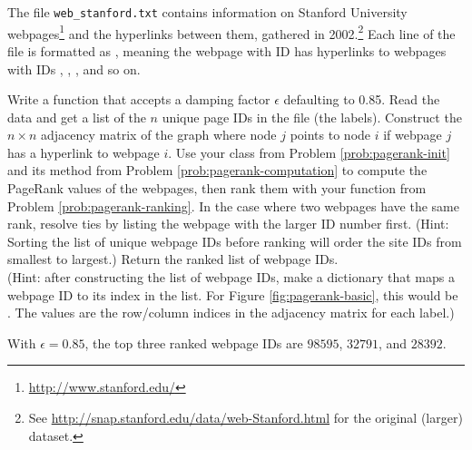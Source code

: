 \begin{comment}
Looking at Figure \ref{fig:pagerank-nosinks}, it is easy to see why a has the lowest PageRank value: the only other node that points to it is b.
It also makes sense that c has the highest ranking, since c and d both have edges from the other three nodes pointing to them, but d only has one edge (pointing to c), while c points to both b and d.
In other words, at each step d distributes all of its importance to c, while c splits its importance between b and d.

Of course, constructing rankings is much more difficult to do by hand when there are more than just a few nodes in the graph.
\end{comment}

\begin{problem} %
The file \texttt{web\_stanford.txt} contains information on Stanford University webpages\footnote{\url{http://www.stanford.edu/}} and the hyperlinks between them, gathered in 2002.\footnote{See \url{http://snap.stanford.edu/data/web-Stanford.html} for the original (larger) dataset.}
Each line of the file is formatted as , meaning the webpage with ID  has hyperlinks to webpages with IDs , , , and so on.

Write a function that accepts a damping factor $\epsilon$ defaulting to 0.85.
Read the data and get a list of the $n$ unique page IDs in the file (the labels).
Construct the $n\times n$ adjacency matrix of the graph where node $j$ points to node $i$ if webpage $j$ has a hyperlink to webpage $i$.
Use your class from Problem \ref{prob:pagerank-init} and its  method from Problem \ref{prob:pagerank-computation} to compute the PageRank values of the webpages, then rank them with your function from Problem \ref{prob:pagerank-ranking}. 
In the case where two webpages have the same rank, resolve ties by listing the webpage with the larger ID number first. 
(Hint: Sorting the list of unique webpage IDs before ranking will order the site IDs from smallest to largest.) 
Return the ranked list of webpage IDs.
\\(Hint: after constructing the list of webpage IDs, make a dictionary that maps a webpage ID to its index in the list.
For Figure \ref{fig:pagerank-basic}, this would be .
The values are the row/column indices in the adjacency matrix for each label.)

With $\epsilon=0.85$, the top three ranked webpage IDs are $98595$, $32791$, and $28392$.
\end{problem}

